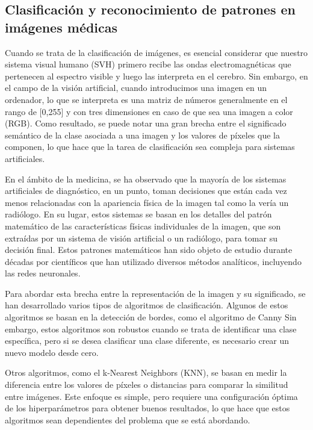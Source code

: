 \subsection*{Clasificación y reconocimiento de patrones en imágenes médicas}  

Cuando se trata de la clasificación de imágenes, es esencial considerar que nuestro sistema visual humano (SVH) primero recibe las ondas electromagnéticas que pertenecen al espectro visible y luego las interpreta en el cerebro. Sin embargo, en el campo de la visión artificial, cuando introducimos una imagen en un ordenador, lo que se interpreta es una matriz de números generalmente en el rango de [0,255] y con tres dimensiones en caso de que sea una imagen a color (RGB). Como resultado, se puede notar una gran brecha entre el significado semántico de la clase asociada a una imagen y los valores de píxeles que la componen, lo que hace que la tarea de clasificación sea compleja para sistemas artificiales. 

En el ámbito de la medicina, se ha observado que la mayoría de los sistemas artificiales de diagnóstico, en un punto, toman decisiones que están cada vez menos relacionadas con la apariencia física de la imagen tal como la vería un radiólogo. En su lugar, estos sistemas se basan en los detalles del patrón matemático de las características físicas individuales de la imagen, que son extraídas por un sistema de visión artificial o un radiólogo, para tomar su decisión final. Estos patrones matemáticos han sido objeto de estudio durante décadas por científicos que han utilizado diversos métodos analíticos, incluyendo las redes neuronales. %

Para abordar esta brecha entre la representación de la imagen y su significado, se han desarrollado varios tipos de algoritmos de clasificación. Algunos de estos algoritmos se basan en la detección de bordes, como el algoritmo de Canny %
Sin embargo, estos algoritmos son robustos cuando se trata de identificar una clase específica, pero si se desea clasificar una clase diferente, es necesario crear un nuevo modelo desde cero.

Otros algoritmos, como el k-Nearest Neighbors (KNN), se basan en medir la diferencia entre los valores de píxeles o distancias para comparar la similitud entre imágenes. Este enfoque es simple, pero requiere una configuración óptima de los hiperparámetros para obtener buenos resultados, lo que hace que estos algoritmos sean dependientes del problema que se está abordando.


